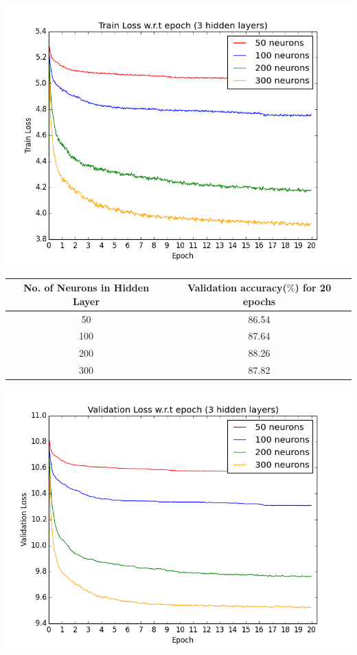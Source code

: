 \documentclass[12pt]{report}
\begin{document}
\begin{center}
    \includegraphics[scale=0.8]{train_3}
\end{center}

\vspace{7mm}

\begin{table}[H]
\label{T:equipos}
\begin{center}
\begin{tabular}{| c | c |}
\hline
\textbf{No. of Neurons in Hidden Layer} & \textbf{Validation accuracy($\%$) for 20 epochs} \\ 
\hline

50 & 86.54  \\ \hline
100 & 87.64 \\ \hline
200 & 88.26  \\ \hline
300 & 87.82  \\ \hline

\end{tabular}
\end{center}
\end{table}


\begin{center}
    \includegraphics[scale=0.8]{val_3}
\end{center}
\end{document}

